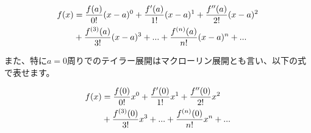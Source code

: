 \begin{eqnarray}
    f(x) &= \frac{f(a)}{0!}(x-a)^0 + \frac{f'(a)}{1!}(x-a)^1 + \frac{f''(a)}{2!}(x-a)^2 \notag \\
    &+ \frac{f^{(3)}(a)}{3!}(x-a)^3+... + \frac{f^{(n)}(a)}{n!}(x-a)^n + ...
\end{eqnarray}

また、特に$a=0$周りでのテイラー展開はマクローリン展開とも言い、以下の式で表せます。

\begin{eqnarray}
    f(x) &= \frac{f(0)}{0!}x^0 + \frac{f'(0)}{1!}x^1 + \frac{f''(0)}{2!}x^2 \notag \\
    &+ \frac{f^{(3)}(0)}{3!}x^3+... + \frac{f^{(n)}(0)}{n!}x^n + ...
\end{eqnarray}